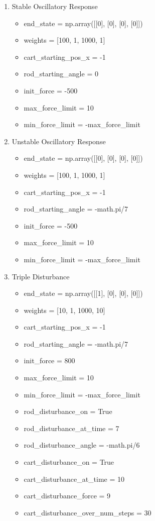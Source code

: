 \documentclass{article}
\begin{document}
\begin{enumerate}
    \item Stable Oscillatory Response
        \begin{itemize}
            \item end\_state = np.array([[0], [0], [0], [0]])
            \item weights = [100, 1, 1000, 1]
            \item cart\_starting\_pos\_x = -1
            \item rod\_starting\_angle = 0
            \item init\_force = -500
            \item max\_force\_limit = 10
            \item min\_force\_limit = -max\_force\_limit
        \end{itemize}
        
    \item Unstable Oscillatory Response
        \begin{itemize}
            \item end\_state = np.array([[0], [0], [0], [0]])
            \item weights = [100, 1, 1000, 1]
            \item cart\_starting\_pos\_x = -1
            \item rod\_starting\_angle = -math.pi/7
            \item init\_force = -500
            \item max\_force\_limit = 10
            \item min\_force\_limit = -max\_force\_limit
        \end{itemize}
        
    \item Triple Disturbance 
         \begin{itemize}
            \item end\_state = np.array([[1], [0], [0], [0]])
            \item weights = [10, 1, 1000, 10]
            \item cart\_starting\_pos\_x = -1
            \item rod\_starting\_angle = -math.pi/7
            \item init\_force = 800
            \item max\_force\_limit = 10
            \item min\_force\_limit = -max\_force\_limit
            \item rod\_disturbance\_on = True
            \item rod\_disturbance\_at\_time = 7
            \item rod\_disturbance\_angle = -math.pi/6
            \item cart\_disturbance\_on = True
            \item cart\_disturbance\_at\_time = 10
            \item cart\_disturbance\_force = 9
            \item cart\_disturbance\_over\_num\_steps = 30
        \end{itemize}
    

\end{enumerate}
\end{document}

